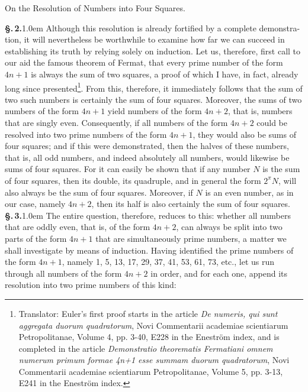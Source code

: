 \documentclass[12pt]{article}
\newcommand{\heading}[1]{%
  \par\addvspace{2.0ex plus .5ex minus .3ex}%
  {\centering\large #1\par}%
  \addvspace{1.0ex plus .3ex minus .2ex}}
\newcommand{\pnum}[1]{\textbf{\S.\,#1.}\kern1.0em}
\begin{document}
\heading{On the Resolution of Numbers into Four Squares.}

\pnum{2} Although this resolution is already fortified by a complete demonstra-tion, it will nevertheless be worthwhile to examine how far we can succeed in establishing its truth by relying solely on induction. Let us, therefore, first call to our aid the famous theorem of Fermat, that every prime number of the form $4n+1$ is always the sum of two squares, a proof of which I have, in fact, already long since presented\footnote{Translator: Euler's first proof starts in the article \textit{De numeris, qui sunt aggregata duorum quadratorum}, Novi Commentarii academiae scientiarum Petropolitanae, Volume 4, pp. 3-40, E228 in the Eneström index, and is completed in the article \textit{Demonstratio theorematis Fermatiani omnem numerum primum formae 4n+1 esse summam duorum quadratorum}, Novi Commentarii academiae scientiarum Petropolitanae, Volume 5, pp. 3-13, E241 in the Eneström index.}. From this, therefore, it immediately follows that the sum of two such numbers is certainly the sum of four squares. Moreover, the sums of two numbers of the form $4n+1$ yield numbers of the form $4n+2$, that is, numbers that are singly even. Consequently, if all numbers of the form $4n+2$ could be resolved into two prime numbers of the form $4n+1$, they would also be sums of four squares; and if this were demonstrated, then the halves of these numbers, that is, all odd numbers, and indeed absolutely all numbers, would likewise be sums of four squares. For it can easily be shown that if any number $N$ is the sum of four squares, then its double, its quadruple, and in general the form $2^{\pi}N$, will also always be the sum of four squares. Moreover, if $N$ is an even number, as in our case, namely $4n + 2$, then its half is also certainly the sum of four squares.\\

\pnum{3} The entire question, therefore, reduces to this: whether all numbers that are oddly even, that is, of the form $4n + 2$, can always be split into two parts of the form $4n + 1$ that are simultaneously prime numbers, a matter we shall investigate by means of induction. Having identified the prime numbers of the form $4n + 1$, namely 1, 5, 13, 17, 29, 37, 41, 53, 61, 73, etc., let us run through all numbers of the form $4n + 2$ in order, and for each one, append its resolution into two prime numbers of this kind:\\
\end{document}
